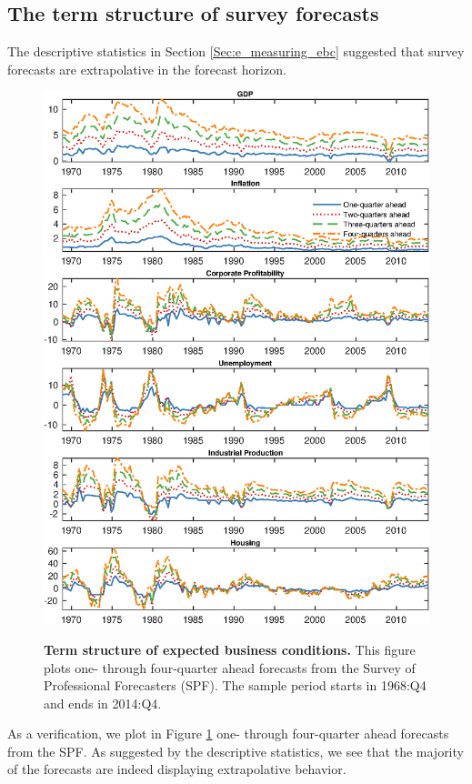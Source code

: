 \documentclass[12pt,a4paper,onecolumn,oneside,notitlepage]{article}
\begin{document}
\begin{appendices}

\section{The term structure of survey forecasts}\label{sec:e_the_term_structure_of_expected_business_conditions}
The descriptive statistics in Section \ref{Sec:e_measuring_ebc} suggested that survey forecasts are extrapolative in the forecast horizon.  
\begin{figure}[tbp]
    \caption{
        \textbf{Term structure of expected business conditions.} \newline
        This figure plots one- through four-quarter ahead forecasts from the Survey of Professional Forecasters (SPF). The sample period starts in 1968:Q4 and ends in 2014:Q4.
    }
    \centering
    \includegraphics[scale=0.8]{Figures/e_survey_expectations.eps}
    \label{Fig:e_survey_expectations}
\end{figure}
As a verification, we plot in Figure \ref{Fig:e_survey_expectations} one- through four-quarter ahead forecasts from the SPF. As suggested by the descriptive statistics, we see that the majority of the forecasts are indeed displaying extrapolative behavior.


\end{appendices}
\end{document}
